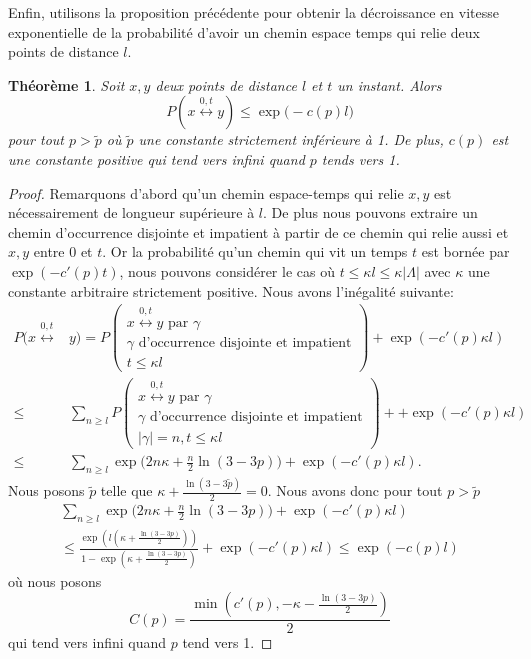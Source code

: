 \documentclass[titlepage,a4paper,12pt]{article}
\newcounter{d}
\newcounter{t}
\newcounter{p}
\newcounter{c}
\newcounter{a}
\newcounter{l}
\newtheorem{thm}[t]{Théorème}
\begin{document}
Enfin, utilisons la proposition précédente pour obtenir la décroissance en vitesse exponentielle de la probabilité d'avoir un chemin espace temps qui relie deux points de distance $l$.
\begin{thm} Soit $x,y$ deux points de distance $l$ et $t$ un instant. Alors 
$$P(x\overset{0,t}{\longleftrightarrow} y)\leqslant \exp\big(-c(p)l\big)
$$pour tout $p > \tilde{p}$ où $\tilde{p}$ une constante strictement inférieure à 1. De plus, $c(p)$ est une constante positive qui tend vers infini quand $p$ tends vers 1.
\end{thm}
\begin{proof}
Remarquons d'abord qu'un chemin espace-temps qui relie $x,y$ est nécessairement de longueur supérieure à $l$. De plus nous pouvons extraire un chemin d'occurrence disjointe et impatient à partir de ce chemin qui relie aussi et $x,y$ entre $0$ et $t$. Or la probabilité qu'un chemin qui vit un temps $t$ est bornée par $\exp(-c'(p)t)$, nous pouvons considérer le cas où $t\leqslant \kappa l \leqslant \kappa |\Lambda|$ avec $\kappa$ une constante arbitraire strictement positive.  Nous avons l'inégalité suivante:
\begin{align*}
P(x\overset{0,t}{\longleftrightarrow}& y)=P\left(\begin{array}{c}x\overset{0,t}{\longleftrightarrow} y\text{ par }\gamma\\\gamma \text{ d'occurrence disjointe et impatient}\\ t \leqslant \kappa l\end{array}\right) + \exp(-c'(p)\kappa l)\\
\leqslant& \sum_{n\geqslant l}P\left(\begin{array}{c}x\overset{0,t}{\longleftrightarrow} y\text{ par }\gamma\\\gamma \text{ d'occurrence disjointe et impatient}\\ |\gamma| = n, t \leqslant \kappa l\end{array}\right)+ + \exp(-c'(p)\kappa l)\\
\leqslant& \sum_{n\geqslant l} \exp\big(2n\kappa+\frac{n}{2}\ln(3-3p)\big) + \exp(-c'(p)\kappa l).
\end{align*}
Nous posons $\tilde{p}$ telle que $\kappa+\frac{\ln(3-3\tilde{p})}{2} = 0$. Nous avons donc pour tout $p>\tilde{p}$
\begin{multline*} \sum_{n\geqslant l} \exp\big(2n\kappa+\frac{n}{2}\ln(3-3p)\big) + \exp(-c'(p)\kappa l) \\
\leqslant \frac{\exp(l(\kappa+\frac{\ln(3-3p)}{2}))}{1-\exp(\kappa+\frac{\ln(3-3p)}{2})}+\exp(-c'(p)\kappa l)\leqslant \exp(-c(p)l)
\end{multline*}
où nous posons $$C(p) = \frac{\min(c'(p),-\kappa-\frac{\ln(3-3p)}{2})}{2}$$ qui tend vers infini quand $p$ tend vers 1.
\end{proof}
\end{document}
